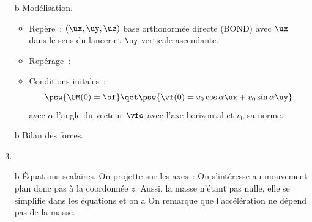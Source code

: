 \documentclass[../../main/main.tex]{subfiles}
\begin{document}
\begin{enumerate}[label=\sqenumi, start=3]
	\vspace{-40pt}
	\item[b]{Modélisation}.
	      \begin{itemize}
		      \item Repère~: $(\ux, \uy, \uz)$ base orthonormée directe (BOND) avec $\ux$
		            dans le sens du lancer et $\uy$ verticale ascendante.
		      \item Repérage~:
		            \vspace{-15pt}
		      \item Conditions initales~:
		            \[
			            \psw{%
				            \OM(0) = \of
			            }
			            \qet
			            \psw{%
				            \vf(0) = v_0\cos\alpha\ux + v_0\sin\alpha\uy
			            }
		            \]
		            avec $\alpha$ l'angle du vecteur $\vfo$ avec l'axe
		            horizontal et $v_0$ sa norme.
	      \end{itemize}
	\item[b]{Bilan des forces.}
	\item {}
	\item[b]{Équations scalaires.} On projette sur les axes~:
	      \psw{%
		      \[
			      \left\{
			      \begin{array}{l}
				      m\ddot{x}(t) = 0   \\
				      m\ddot{y}(t) = -mg \\
				      m\ddot{z}(t) = 0
			      \end{array}
			      \right.
		      \]
	      }
	      On s'intéresse au mouvement plan donc pas à la coordonnée $z$. Aussi, la
	      masse n'étant pas nulle, elle se simplifie dans les équations et on a
	      \psw{%
		      \[
			      \left\{
			      \begin{array}{l}
				      \ddot{x}(t) = 0 \\
				      \ddot{y}(t) = -g
			      \end{array}
			      \right.
		      \]
	      }
	      On remarque que l'accélération ne dépend pas de la masse.
\end{enumerate}
\end{document}
